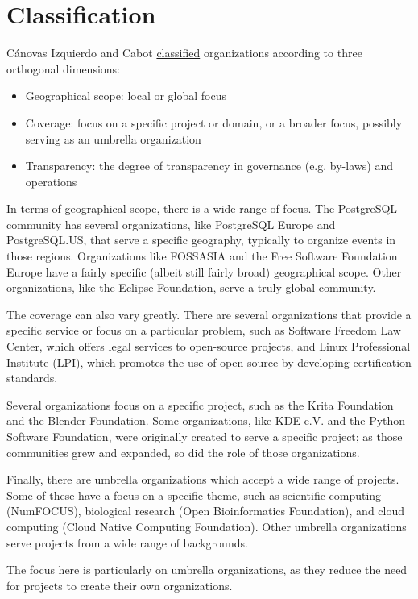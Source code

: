 


\chapter{Classification}

Cánovas Izquierdo and Cabot \href{https://arxiv.org/pdf/2005.10063.pdf}{classified} organizations according to three orthogonal dimensions:

\begin{itemize}

\item Geographical scope: local or global focus

\item Coverage: focus on a specific project or domain, or a broader focus, possibly serving as an umbrella organization

\item Transparency: the degree of transparency in governance (e.g. by-laws) and operations

\end{itemize}

In terms of geographical scope, there is a wide range of focus.  The PostgreSQL community has several organizations, like PostgreSQL Europe and PostgreSQL.US, that serve a specific geography, typically to organize events in those regions.  Organizations like FOSSASIA and the Free Software Foundation Europe have a fairly specific (albeit still fairly broad) geographical scope.  Other organizations, like the Eclipse Foundation, serve a truly global community.

The coverage can also vary greatly.  There are several organizations that provide a specific service or focus on a particular problem, such as Software Freedom Law Center, which offers legal services to open-source projects, and Linux Professional Institute (LPI), which promotes the use of open source by developing certification standards.

Several organizations focus on a specific project, such as the Krita Foundation and the Blender Foundation.  Some organizations, like KDE e.V. and the Python Software Foundation, were originally created to serve a specific project; as those communities grew and expanded, so did the role of those organizations.

Finally, there are umbrella organizations which accept a wide range of projects.  Some of these have a focus on a specific theme, such as scientific computing (NumFOCUS), biological research (Open Bioinformatics Foundation), and cloud computing (Cloud Native Computing Foundation).  Other umbrella organizations serve projects from a wide range of backgrounds.

The focus here is particularly on umbrella organizations, as they reduce the need for projects to create their own organizations.

